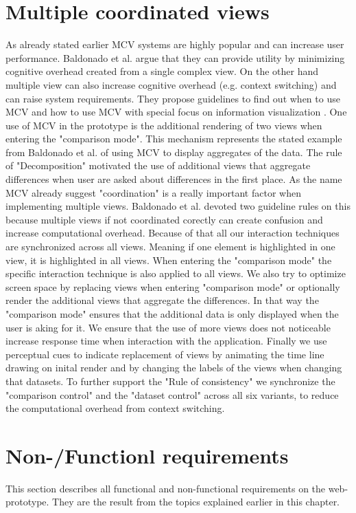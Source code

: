 \section{Multiple coordinated views}
As already stated earlier MCV systems are highly popular and can increase user performance. Baldonado et al. argue that they can provide utility
by minimizing cognitive overhead created from a single complex view. On the other hand multiple view can also increase cognitive overhead
(e.g. context switching) and can raise system requirements. They propose guidelines to find out when to use MCV and how to use MCV
with special focus on information visualization \citep*{WangBaldonado.2000}. One use of MCV in the prototype is the additional rendering of
two views when entering the "comparison mode". This mechanism represents the stated example from Baldonado et al. of using MCV to display
aggregates of the data. The rule of "Decomposition" motivated the use of additional views that aggregate differences when user are asked
about differences in the first place. As the name MCV already suggest "coordination" is a really important factor when implementing
multiple views. Baldonado et al. devoted two guideline rules on this because multiple views if not coordinated corectly can create
confusion and increase computational overhead. Because of that all our interaction techniques are synchronized across all views. Meaning if one
element is highlighted in one view, it is highlighted in all views. When entering the "comparison mode" the specific interaction technique
is also applied to all views. We also try to optimize screen space by replacing views when entering "comparison mode" or optionally render
the additional views that aggregate the differences. In that way the "comparison mode" ensures that the additional data is only displayed when the user is aking for it. We ensure that the use of more views does not noticeable increase
response time when interaction with the application. Finally we use perceptual cues to indicate replacement of views by animating
the time line drawing on inital render and by changing the labels of the views when changing that datasets. 
To further support the "Rule of consistency" we synchronize the "comparison control" and the "dataset control" across all six variants, to reduce
the computational overhead from context switching.

\section{Non-/Functionl requirements}
This section describes all functional and non-functional requirements on the
web-prototype. They are the result from the topics explained earlier in this chapter.

